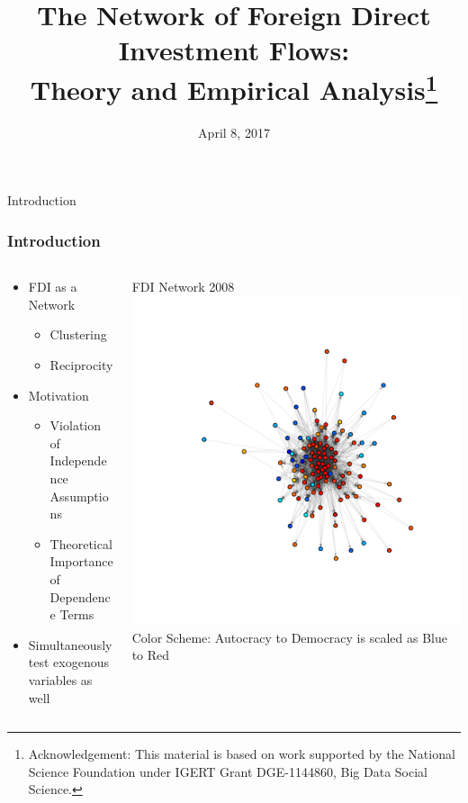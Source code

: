 \documentclass{beamer}
\title[The Network of FDI Flows]{The Network of Foreign Direct Investment Flows:\\Theory and Empirical Analysis\thanks{\footnotesize {Acknowledgement: This material is based on work supported by the National Science Foundation under IGERT Grant DGE-1144860, Big Data Social Science.}}}
\author[J.\,Schoeneman, B. \,Zhu \& B.\,Desmarais]{%
  \texorpdfstring{%
    \begin{columns}
      \column{.3\linewidth}
      \centering
      John Schoeneman{\thanks{Pennsylvania State University}} \\ \small{jbs5686@psu.edu\\ PhD Candidate}
      \column{.3\linewidth}
      \centering
      Boliang Zhu{\samethanks[2]} \\ \small{bxz14@psu.edu\\ Assistant Professor}
    \end{columns}
    \vspace{12pt}
    \begin{columns}
      \column{.3\linewidth}
      \centering
      Bruce Desmarais{\samethanks[2]}\\ \small{bdesmarais@psu.edu\\ Associate Professor}
    \end{columns}
 }
 {Author 1, Author 2, Author 3}
}
\date{April 8, 2017}
\begin{document}
\begin{frame}
  \titlepage
\end{frame}




\begin{frame}{Introduction}

\frametitle{Introduction}
  \begin{columns}[T]
    \begin{column}{.5\textwidth}
\vspace{10mm}
\begin{itemize}
\item{FDI as a Network}
\begin{itemize}
\item{Clustering}
\item{Reciprocity}
 \end{itemize}
 \item{Motivation}
 \begin{itemize}
\item{Violation of Independence Assumptions}
\item{Theoretical Importance of Dependence Terms}
 \end{itemize}
  \item{Simultaneously test exogenous variables as well}
 \end{itemize}
    \end{column}
    \begin{column}{.5\textwidth}
    \begin{block}{FDI Network 2008}
    \includegraphics[scale=.4]{slides_figures/fdiNet2008.pdf}
 \small{\\ Color Scheme: Autocracy to Democracy is scaled as Blue to Red}
    \end{block}
    \end{column}
  \end{columns}


\end{frame}
\end{document}
